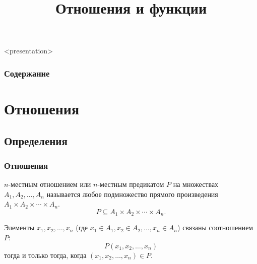 


\title[Отношения и функции]{Отношения и функции}





\begin{frame}<presentation>
    \frametitle{Содержание}
    \tableofcontents
\end{frame}


\section{Отношения}


\subsection{Определения}

\begin{frame}
    \frametitle{Отношения}
    
    \begin{definition}
        $n$-местным \alert{отношением} или $n$-местным \alert{предикатом} $P$ на множествах $A_1, A_2, \ldots, A_n$ называется любое подмножество прямого произведения $A_1\times A_2\times \cdots\times A_n$.
        \[
            P\subseteq A_1\times A_2\times \cdots\times A_n.
        \]
    \end{definition}
    
    \begin{definition}
        Элементы $x_1,x_2,\ldots,x_n$ (где $x_1\in A_1,x_2\in A_2,\ldots,x_n\in A_n$) связаны соотношением $P$:
        \[
            P(x_1,x_2,\ldots,x_n)
        \] 
        тогда и только тогда, когда $(x_1,x_2,\ldots,x_n)\in P$.
    \end{definition}
\end{frame}

